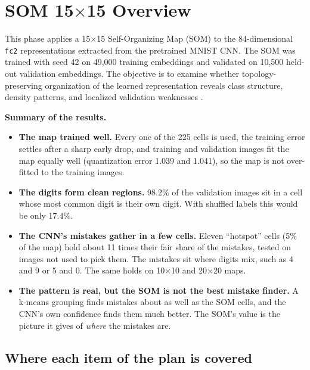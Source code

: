 \documentclass[11pt]{article}
\begin{document}
\section{SOM 15$\times$15 Overview}

This phase applies a 15$\times$15 Self-Organizing Map (SOM) to the
84-dimensional \texttt{fc2} representations extracted from the pretrained
MNIST CNN. The SOM was trained with seed 42 on 49,000 training embeddings and
validated on 10,500 held-out validation embeddings. The objective is to examine
whether topology-preserving organization of the learned representation reveals
class structure, density patterns, and localized validation weaknesses
\cite{kohonen1990som,jafari_nnsom}.

\textbf{Summary of the results.}
\begin{itemize}[leftmargin=1.4em, itemsep=1pt]
  \item \textbf{The map trained well.} Every one of the 225 cells is used, the training error settles after a sharp early drop, and training and validation images fit the map equally well (quantization error 1.039 and 1.041), so the map is not over-fitted to the training images.
  \item \textbf{The digits form clean regions.} 98.2\% of the validation images sit in a cell whose most common digit is their own digit. With shuffled labels this would be only 17.4\%.
  \item \textbf{The CNN's mistakes gather in a few cells.} Eleven ``hotspot'' cells (5\% of the map) hold about 11 times their fair share of the mistakes, tested on images not used to pick them. The mistakes sit where digits mix, such as 4 and 9 or 5 and 0. The same holds on 10$\times$10 and 20$\times$20 maps.
  \item \textbf{The pattern is real, but the SOM is not the best mistake finder.} A k-means grouping finds mistakes about as well as the SOM cells, and the CNN's own confidence finds them much better. The SOM's value is the picture it gives of \emph{where} the mistakes are.
\end{itemize}

\subsection*{Where each item of the plan is covered}
\end{document}
